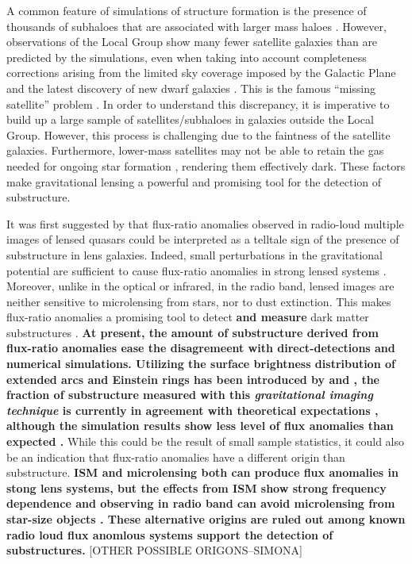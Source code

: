 \documentclass[useAMS,usenatbib]{mnras}
\begin{document}
A common feature of simulations of structure formation is the presence
of thousands of subhaloes that are associated with larger mass haloes \citep[e.g.][]{Springel08}.
However, observations of the Local Group show many fewer satellite
galaxies than are predicted by the simulations, even when taking into
account completeness corrections arising from the limited sky coverage
imposed by the Galactic Plane and the latest discovery of new dwarf galaxies \citep{DES15,Kop15}.  
This is the famous ``missing satellite'' problem \citep{Klypin1999, Moore1999, S07}. In order to
understand this discrepancy, it is imperative to build up a large
sample of satellites/subhaloes in galaxies outside the Local Group.
 However, this process is challenging due to the faintness of the satellite
galaxies.  Furthermore, lower-mass satellites may not be able to
retain the gas needed for ongoing star formation \citep[e.g.][]{P11},
rendering them effectively dark.  These factors make gravitational
lensing a powerful and promising tool for the detection of
substructure.

It was first suggested by \citet{Mao1998} that flux-ratio anomalies
observed in radio-loud multiple images of lensed quasars could be
interpreted as a telltale sign of the presence of substructure in lens
galaxies.  Indeed, small perturbations in the gravitational potential
are sufficient to cause flux-ratio anomalies in strong lensed systems
\citep{Bradac02}.  Moreover, unlike in the optical or infrared, in the
radio band, lensed images are neither sensitive to microlensing from
stars, nor to dust extinction. This makes flux-ratio anomalies a promising
tool to detect \textbf{and measure} dark matter substructures \citep{Dalal2002,N13}.  
\textbf{At present, the amount of substructure derived from flux-ratio anomalies ease the disagremeent with direct-detections and numerical simulations.
Utilizing the surface brightness distribution of extended arcs and Einstein rings
has been introduced by \citet{K05} and \citet{V09}, the fraction of
substructure measured with this \emph{gravitational imaging technique}
is currently in agreement with theoretical expectations \citep{V14a,V12}, although the simulation results show less level of flux anomalies than expected \citep{Xu14}.}
While this could be the result of small sample
statistics, it could also be an indication that flux-ratio anomalies
have a different origin than substructure. \textbf{ISM and microlensing both can produce flux anomalies in stong lens systems, but the effects from ISM show strong frequency dependence and observing in radio band can avoid microlensing from star-size objects \citep{KD04}. These alternative origins are ruled out among known radio loud flux anomlous systems support the detection of substructures. }[OTHER POSSIBLE ORIGONS--SIMONA]
%
\end{document}
